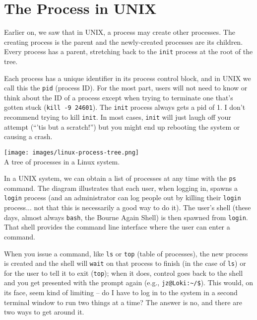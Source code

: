 




\section*{The Process in UNIX}

Earlier on, we saw that in UNIX, a process may create other processes. The creating process is the parent and the newly-created processes are its children. Every process has a parent, stretching back to the \texttt{init} process at the root of the tree.

Each process has a unique identifier in its process control block, and in UNIX we call this the \texttt{pid} (process ID). For the most part, users will not need to know or think about the ID of a process except when trying to terminate one that's gotten stuck (\texttt{kill -9 24601}). The \texttt{init} process always gets a pid of 1. I don't recommend trying to kill \texttt{init}. In most cases, \texttt{init} will just laugh off your attempt (``'tis but a scratch!'') but you might end up rebooting the system or causing a crash.

\begin{center}
\texttt{[image: images/linux-process-tree.png]}\\
A tree of processes in a Linux system.
\end{center}

In a UNIX system, we can obtain a list of processes at any time with the \texttt{ps} command. The diagram illustrates that each user, when logging in, spawns a \texttt{login} process (and an administrator can log people out by killing their \texttt{login} process... not that this is necessarily a good way to do it). The user's shell (these days, almost always \texttt{bash}, the Bourne Again Shell) is then spawned from \texttt{login}. That shell provides the command line interface where the user can enter a command.

When you issue a command, like \texttt{ls} or \texttt{top} (table of processes), the new process is created and the shell will \texttt{wait} on that process to finish (in the case of \texttt{ls}) or for the user to tell it to exit (\texttt{top}); when it does, control goes back to the shell and you get presented with the prompt again (e.g., \texttt{jz@Loki:\~{}/\$}). This would, on its face, seem kind of limiting -- do I have to log in to the system in a second terminal window to run two things at a time? The answer is no, and there are two ways to get around it.

